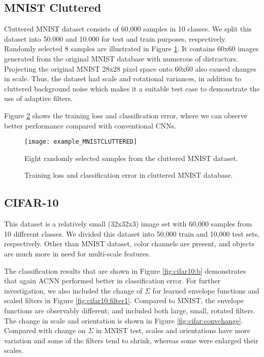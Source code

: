 \documentclass{bmvc2k}
\begin{document}
\subsection{MNIST Cluttered}
\label{mnistclut}
Cluttered MNIST dataset \cite{mnistcluttered} consists of 60,000 samples in 10 classes. We split this dataset into 50.000 and 10.000 for test and train purposes, respectively. Randomly selected 8 samples are illustrated in Figure \ref{fig:abc}. It contains 60x60 images generated from the original MNIST database with numerous of distractors. Projecting the original MNIST 28x28 pixel space onto 60x60 also caused changes in scale. Thus, the dataset had scale and rotational variances, in addition to cluttered background noise which makes it a suitable test case to demonstrate the use of adaptive filters.

Figure \ref{fig:mnistclutteredplot} shows the training loss and classification error, where we can observe better performance compared with conventional CNNs.

\begin{figure}
	\centering
	\texttt{[image: example\_MNISTCLUTTERED]}
	\caption{Eight randomly selected samples from the cluttered MNIST dataset.}
	\label{fig:abc}
\end{figure}

\begin{figure}
	\centering     %
	\caption{Training loss and classification error in cluttered MNIST database.}
	\label{fig:mnistclutteredplot}
\end{figure}

\subsection{CIFAR-10}

This dataset \cite{cifar10} is a relatively small (32x32x3) image set with 60,000 samples from 10 different classes. We divided this dataset into 50,000 train and 10,000 test sets, respectively. Other than MNIST dataset, color channels are present, and objects are much more in need for multi-scale features.

The classification results that are shown in Figure \ref{fig:cifar10:b} demonstrates that again ACNN performed better in classification error. For further investigation, we also included the change of $\Sigma$ for learned envelope functions and scaled filters in Figure \ref{fig:cifar10:filter1}. Compared to MNIST, the envelope functions are observably different; and included both large, small, rotated filters. The change in scale and orientation is shown in Figure \ref{fig:cifar:convchange}. Compared with change on $\Sigma$ in MNIST test, scales and orientations have more variation and some of the filters tend to shrink, whereas some were enlarged their scales.
\end{document}
